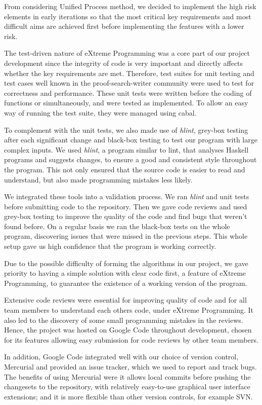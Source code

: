 From considering Unified Process method, we decided to implement the high risk elements in early iterations so that the most critical key requirements and most difficult aims are achieved first before implementing the features with a lower risk.

The test-driven nature of eXtreme Programming was a core part of our project development since the integrity of code is very important and directly affects whether the key requirements are met. Therefore, test suites for unit testing and test cases well known in the proof-search-writer community were used to test for correctness and performance. These unit tests were written before the coding of functions or simultaneously, and were tested as implemented. To allow an easy way of running the test suite, they were managed using cabal.

To complement with the unit tests, we also made use of \emph{hlint}, grey-box testing after each significant change and black-box testing to test our program with large complex inputs. We used \emph{hlint}, a program similar to lint, that analyses Haskell programs and suggests changes, to ensure a good and consistent style throughout the program. This not only ensured that the source code is easier to read and understand, but also made programming mistakes less likely.

We integrated these tools into a validation process. We ran \emph{hlint} and unit tests before submitting code to the repository. Then we gave code reviews and used grey-box testing to improve the quality of the code and find bugs that weren't found before. On a regular basis we ran the black-box tests on the whole program, discovering issues that were missed in the previous steps. This whole setup gave us high confidence that the program is working correctly.

Due to the possible difficulty of forming the algorithms in our project, we gave priority to having a simple solution with clear code first, a feature of eXtreme Programming, to guarantee the existence of a working version of the program.

Extensive code reviews were essential for improving quality of code and for all team members to understand each others code, under eXtreme Programming. It also led to the discovery of some small programming mistakes in the reviews. Hence, the project was hosted on Google Code throughout development, chosen for its features allowing easy submission for code reviews by other team members.

In addition, Google Code integrated well with our choice of version control, Mercurial and provided an issue tracker, which we used to report and track bugs. The benefits of using Mercurial were it allows local commits before pushing the changesets to the repository, with relatively easy-to-use graphical user interface extensions; and it is more flexible than other version controls, for example SVN.

